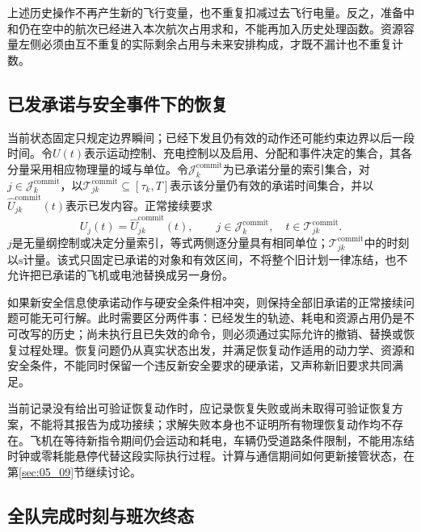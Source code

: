 上述历史操作不再产生新的飞行变量，也不重复扣减过去飞行电量。反之，准备中和仍在空中的航次已经进入本次航次占用求和，不能再加入历史处理函数。资源容量左侧必须由互不重复的实际剩余占用与未来安排构成，才既不漏计也不重复计数。

\subsection{已发承诺与安全事件下的恢复}

当前状态固定只规定边界瞬间；已经下发且仍有效的动作还可能约束边界以后一段时间。令$U(t)$表示运动控制、充电控制以及启用、分配和事件决定的集合，其各分量采用相应物理量的域与单位。令$\mathcal J_k^{\mathrm{commit}}$为已承诺分量的索引集合，对$j\in\mathcal J_k^{\mathrm{commit}}$，以$\mathcal T_{jk}^{\mathrm{commit}}\subseteq[\tau_k,T]$表示该分量仍有效的承诺时间集合，并以$\widehat U_{jk}^{\mathrm{commit}}(t)$表示已发内容。正常接续要求
\begin{equation}
 U_j(t)=\widehat U_{jk}^{\mathrm{commit}}(t),
 \qquad j\in\mathcal J_k^{\mathrm{commit}},\quad
 t\in\mathcal T_{jk}^{\mathrm{commit}}.
 \label{s0507:committed_controls}
\end{equation}
$j$是无量纲控制或决定分量索引，等式两侧逐分量具有相同单位；$\mathcal T_{jk}^{\mathrm{commit}}$中的时刻以$\mathrm s$计量。该式只固定已承诺的对象和有效区间，不将整个旧计划一律冻结，也不允许把已承诺的飞机或电池替换成另一身份。

如果新安全信息使承诺动作与硬安全条件相冲突，则保持全部旧承诺的正常接续问题可能无可行解。此时需要区分两件事：已经发生的轨迹、耗电和资源占用仍是不可改写的历史；尚未执行且已失效的命令，则必须通过实际允许的撤销、替换或恢复过程处理。恢复问题仍从真实状态出发，并满足恢复动作适用的动力学、资源和安全条件，不能同时保留一个违反新安全要求的硬承诺，又声称新旧要求共同满足。

当前记录没有给出可验证恢复动作时，应记录恢复失败或尚未取得可验证恢复方案，不能将其报告为成功接续；求解失败本身也不证明所有物理恢复动作均不存在。飞机在等待新指令期间仍会运动和耗电，车辆仍受道路条件限制，不能用冻结时钟或零耗能悬停代替这段实际执行过程。计算与通信期间如何更新接管状态，在第\ref{sec:05_09}节继续讨论。

\subsection{全队完成时刻与班次终态}


